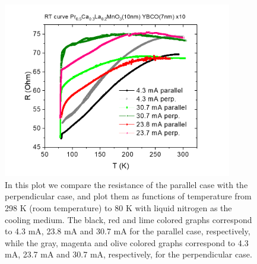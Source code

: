 \documentclass{comjnl}
\begin{document}
\begin{figure}[h]
\centering
\includegraphics[width=100mm]{Bilde2.png}
\caption{In this plot we compare the resistance of the parallel case with the perpendicular case, and plot them as functions of temperature from 298 K (room temperature) to 80 K with liquid nitrogen as the cooling medium. The black, red and lime colored graphs correspond to 4.3 mA, 23.8 mA and 30.7 mA for the parallel case, respectively, while the gray, magenta and olive colored graphs correspond to 4.3 mA, 23.7 mA and 30.7 mA, respectively, for the perpendicular case. \label{fig:res}}
\end{figure}
\end{document}
